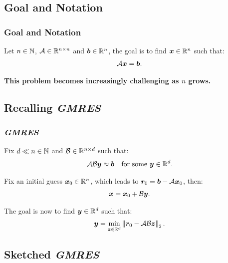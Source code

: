 \subsection{Goal and Notation}

\begin{frame}
    \frametitle{Goal and Notation}

    Let $n \in \mathbb{N}$,  $\mathcal{A} \in \mathbb{R}^{n \times n}$ and $\bm{b} \in \mathbb{R}^{n}$, the goal is to find $\bm{x} \in \mathbb{R}^{n}$ such that:
    \begin{align}
        \mathcal{A} \bm{x} = \bm{b}. \label{eq:system}
    \end{align}

    \textbf{This problem becomes increasingly challenging as $n$ grows.}

\end{frame}

\subsection{Recalling \textit{GMRES}}

\begin{frame}
    \frametitle{\textit{GMRES}}

    Fix $d \ll n \in \mathbb{N}$ and $\mathcal{B} \in \mathbb{R}^{n \times d}$ such that:
    \begin{align}
        \mathcal{A} \mathcal{B} \bm{y} &\approx \bm{b} &\text{for some } \bm{y} \in \mathbb{R}^{d}.
    \end{align}

    Fix an initial guess $\bm{x}_0 \in \mathbb{R}^{n}$, which leads to $\bm{r}_0 = \bm{b} - \mathcal{A} \bm{x}_0$, then:
    \begin{align}
        \bm{x} = \bm{x}_0 + \mathcal{B} \bm{y}.
    \end{align}

    The goal is now to find $\bm{y} \in \mathbb{R}^{d}$ such that:
    \begin{align}
        \bm{y} = \min_{\bm{z} \in \mathbb{R}^{d}} \left\lVert \bm{r}_0 - \mathcal{A} \mathcal{B} \bm{z} \right\rVert_2. \label{eq:min_problem}
    \end{align}

\end{frame}

\subsection{Sketched \textit{GMRES}}

